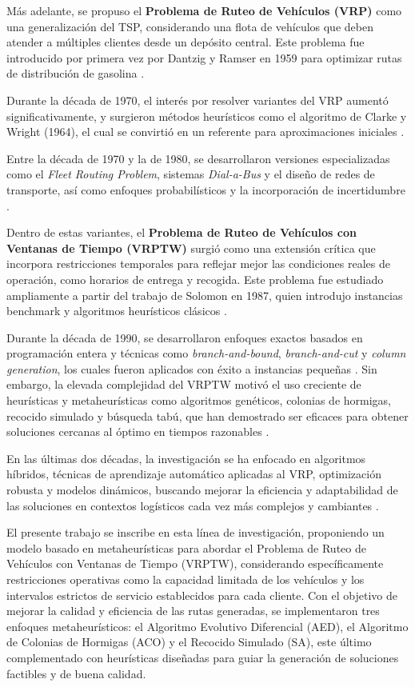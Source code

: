 \documentclass[12pt,titlepage,twoside,openright]{book}
\begin{document}
Más adelante, se propuso el \textbf{Problema de Ruteo de Vehículos (VRP)} como una generalización del TSP, considerando una flota de vehículos que deben atender a múltiples clientes desde un depósito central. Este problema fue introducido por primera vez por Dantzig y Ramser en 1959 para optimizar rutas de distribución de gasolina \citep{dantzig1959truck}.

Durante la década de 1970, el interés por resolver variantes del VRP aumentó significativamente, y surgieron métodos heurísticos como el algoritmo de Clarke y Wright (1964), el cual se convirtió en un referente para aproximaciones iniciales \citep{clarke1964scheduling}.

Entre la década de 1970 y la de 1980, se desarrollaron versiones especializadas como el \textit{Fleet Routing Problem}, sistemas \textit{Dial-a-Bus} y el diseño de redes de transporte, así como enfoques probabilísticos y la incorporación de incertidumbre \citep{eksioglu2009, golden1988, laporte1992}.

Dentro de estas variantes, el \textbf{Problema de Ruteo de Vehículos con Ventanas de Tiempo (VRPTW)} surgió como una extensión crítica que incorpora restricciones temporales para reflejar mejor las condiciones reales de operación, como horarios de entrega y recogida. Este problema fue estudiado ampliamente a partir del trabajo de Solomon en 1987, quien introdujo instancias benchmark y algoritmos heurísticos clásicos \citep{solomon1987algorithms}.

Durante la década de 1990, se desarrollaron enfoques exactos basados en programación entera y técnicas como \textit{branch-and-bound}, \textit{branch-and-cut} y \textit{column generation}, los cuales fueron aplicados con éxito a instancias pequeñas \citep{desrochers1992, cordeau2002}. Sin embargo, la elevada complejidad del VRPTW motivó el uso creciente de heurísticas y metaheurísticas como algoritmos genéticos, colonias de hormigas, recocido simulado y búsqueda tabú, que han demostrado ser eficaces para obtener soluciones cercanas al óptimo en tiempos razonables \citep{eksioglu2009}.

En las últimas dos décadas, la investigación se ha enfocado en algoritmos híbridos, técnicas de aprendizaje automático aplicadas al VRP, optimización robusta y modelos dinámicos, buscando mejorar la eficiencia y adaptabilidad de las soluciones en contextos logísticos cada vez más complejos y cambiantes \citep{toth2014}.

El presente trabajo se inscribe en esta línea de investigación, proponiendo un modelo basado en metaheurísticas para abordar el Problema de Ruteo de Vehículos con Ventanas de Tiempo (VRPTW), considerando específicamente restricciones operativas como la capacidad limitada de los vehículos y los intervalos estrictos de servicio establecidos para cada cliente. Con el objetivo de mejorar la calidad y eficiencia de las rutas generadas, se implementaron tres enfoques metaheurísticos: el Algoritmo Evolutivo Diferencial (AED), el Algoritmo de Colonias de Hormigas (ACO) y el Recocido Simulado (SA), este último complementado con heurísticas diseñadas para guiar la generación de soluciones factibles y de buena calidad.
\end{document}
